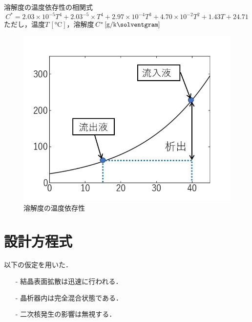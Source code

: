 \documentclass[a4j]{jsreport}
\begin{document}
\noindent 溶解度の温度依存性の相関式
\begin{equation}
    C^*=2.03\times 10^{-5}T^4 +2.03^{-5}\times T^4 + 2.97\times 10^{-4}T^3 + 4.70\times 10^{-2}T^2 + 1.43T + 24.71
\end{equation}
ただし，温度$T \, [\si{\degreeCelsius}]$，溶解度$C^* \, [\si{\gram \per \kilo \solventgram}]$
\begin{figure}[htbp]
  \centering
  \includegraphics[scale=0.7]{BzAsolvent.png}
  \caption{溶解度の温度依存性}
  \label{溶解度の温度依存性}
\end{figure}

\section{設計方程式}
以下の仮定を用いた．
\begin{itemize}
    \setlength{\parskip}{0pt}
    \setlength{\itemsep}{2pt}
    \item[-] 結晶表面拡散は迅速に行われる．
    \item[-] 晶析器内は完全混合状態である．
    \item[-] 二次核発生の影響は無視する．
\end{itemize}
\end{document}

